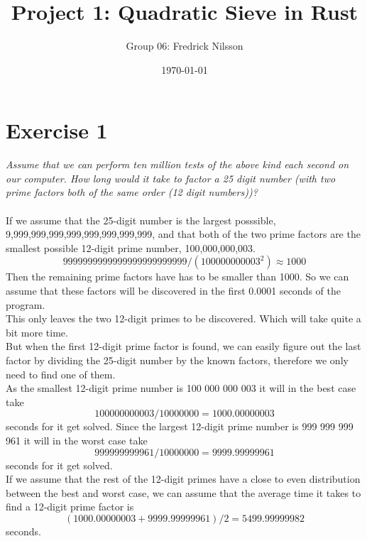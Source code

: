 \documentclass[12pt]{article}
\title{Project 1: Quadratic Sieve in Rust}
\author{Group 06: Fredrick Nilsson}
\date{\today}
\begin{document}
\maketitle


\newpage

\section*{Exercise 1}
\textit{Assume that we can perform ten million tests of the above kind each second on our computer. How long would it take to factor a 25 digit number (with two prime factors both of the same order (12 digit numbers))?}
\\
\\
If we assume that the 25-digit number is the largest posssible, 9,999,999,999,999,999,999,999,999, and that both of the two prime factors are the smallest possible 12-digit prime number, 100,000,000,003. \[ 9999999999999999999999999/(100000000003^2) \approx 1000 \]
Then the remaining prime factors have has to be smaller than 1000. So we can assume that these factors will be discovered in the first 0.0001 seconds of the program.
\\
This only leaves the two 12-digit primes to be discovered. Which will take quite a bit more time.
\\
But when the first 12-digit prime factor is found, we can easily figure out the last factor by dividing the 25-digit number by the known factors, therefore we only need to find one of them.
\\
As the smallest 12-digit prime number is 100 000 000 003 it will in the best case take \[100000000003/10000000 = 1000.00000003 \] seconds for it get solved. Since the largest 12-digit prime number is 999 999 999 961 it will in the worst case take \[999999999961/10000000 = 9999.99999961 \] seconds for it get solved.
\\ 
If we assume that the rest of the 12-digit primes have a close to even distribution between the best and worst case, we can assume that the average time it takes to find a 12-digit prime factor is \[ (1000.00000003 + 9999.99999961)/2 = 5499.99999982 \] seconds.

\newpage
\end{document}
